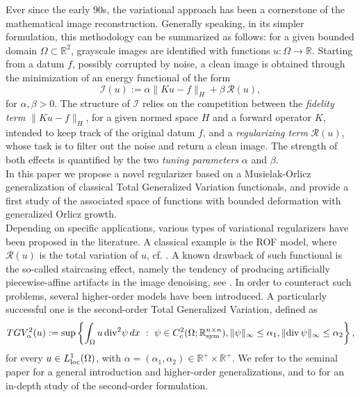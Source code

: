 \documentclass[a4paper,11pt,oneside,notitlepage]{article}
\numberwithin{equation}{section}
\def\R{\mathbb{R}}
\def\loc{{\rm loc}}
\def\sym{{\rm sym}}
\renewcommand{\div}{\mathrm{div}}
\newcommand{\st}{ \ : \ }
\begin{document}
Ever since the early 90s, the variational approach has been a cornerstone of the mathematical image reconstruction. Generally speaking, in its simpler formulation, this methodology can be summarized as follows: for a given bounded domain $\Omega \subset \R^2$, grayscale images are identified with functions $u : \Omega \to \R$. Starting from a datum $f$, possibly corrupted by noise, a clean image is obtained through the minimization of an energy functional of the form
\begin{equation*}
    \mathcal{I}(u) := \alpha \|Ku - f\|_H + \beta \, \mathcal{R}(u),
\end{equation*}
for $\alpha,\beta > 0$. The structure of $\mathcal{I}$ relies on the competition between the \emph{fidelity term} $\|Ku - f\|_H$, for a given normed space $H$ and a forward operator $K$, intended to keep track of the original datum $f$, and a \emph{regularizing term} $\mathcal{R}(u)$, whose task is to filter out the noise and return a clean image. The strength of both effects is quantified by the two \emph{tuning parameters} $\alpha$ and $\beta$.
\\
In this paper we propose a novel regularizer based on a Musielak-Orlicz generalization of classical Total Generalized Variation functionals, and provide a first study of the associated space of functions with bounded deformation with generalized Orlicz growth.
\\
Depending on specific applications, various types of variational regularizers have been proposed in the literature. A classical example is the ROF model, where $\mathcal{R}(u)$ is the total variation of $u$, cf. \cite{ROF92}. A known drawback of such functional is the so-called staircasing effect, namely the tendency of producing artificially piecewise-affine artifacts in the image denoising, see \cite{CL, J16}. In order to counteract such problems, several higher-order models have been introduced. A particularly successful one is the second-order Total Generalized Variation, defined as
\begin{equation*}
    TGV^{2}_\alpha(u) := \sup \left\{ \int_\Omega u \, \div^2 \psi \, dx \st \psi \in C^2_c(\Omega; \R^{n \times n}_\sym), \|\psi\|_\infty \le \alpha_1, \|\div \, \psi\|_\infty \le \alpha_2 \right\},
\end{equation*}
for every $u \in L^1_\loc(\Omega)$, with $\alpha = (\alpha_1, \alpha_2) \in \R^+ \times \R^+$. We refer to the seminal paper \cite{BKP10} for a general introduction and higher-order generalizations, and to \cite{BV20} for an in-depth study of the second-order formulation.
\end{document}
